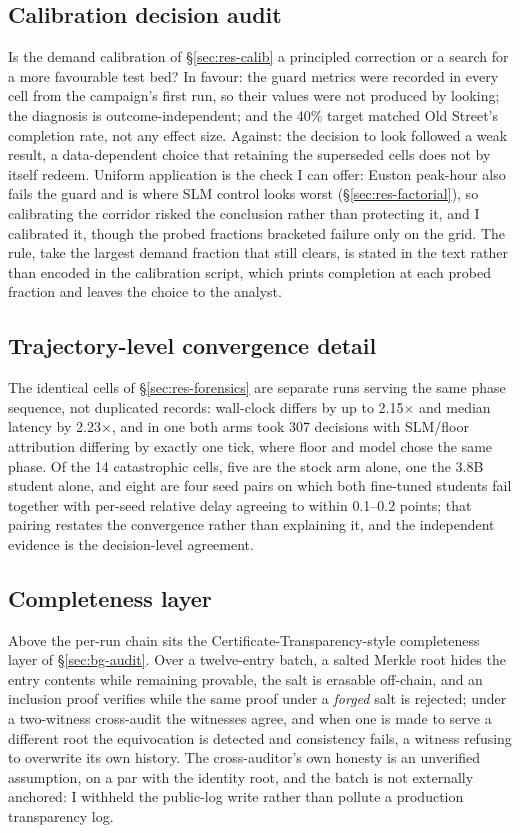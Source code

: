 \subsection{Calibration decision audit}\label{app:calib-audit}
Is the demand calibration of \S\ref{sec:res-calib} a principled correction
or a search for a more favourable test bed? In favour: the guard metrics
were recorded in every cell from the campaign's first run, so their values
were not produced by looking; the diagnosis is outcome-independent; and
the 40\% target matched Old Street's completion rate, not any effect size.
Against: the decision to look followed a weak result, a data-dependent
choice that retaining the superseded cells does not by itself redeem.
Uniform application is the check I can offer: Euston peak-hour also fails
the guard and is where SLM control looks worst (\S\ref{sec:res-factorial}),
so calibrating the corridor risked the conclusion rather than protecting
it, and I calibrated it, though the probed fractions bracketed failure only
on the grid. The rule, take the largest demand fraction that still clears,
is stated in the text rather than encoded in the calibration script, which
prints completion at each probed fraction and leaves the choice to the
analyst.

\subsection{Trajectory-level convergence detail}\label{app:convergence}
The identical cells of \S\ref{sec:res-forensics} are separate runs serving
the same phase sequence, not duplicated records: wall-clock differs by up
to 2.15$\times$ and median latency by 2.23$\times$, and in one both arms
took 307 decisions with SLM/floor attribution differing by exactly one
tick, where floor and model chose the same phase. Of the 14 catastrophic
cells, five are the stock arm alone, one the 3.8B student alone, and eight
are four seed pairs on which both fine-tuned students fail together with
per-seed relative delay agreeing to within 0.1--0.2 points; that pairing
restates the convergence rather than explaining it, and the independent
evidence is the decision-level agreement.

\subsection{Completeness layer}\label{app:ct}
Above the per-run chain sits the Certificate-Transparency-style
completeness layer of \S\ref{sec:bg-audit}. Over a twelve-entry batch, a
salted Merkle root hides the entry contents while remaining provable, the
salt is erasable off-chain, and an inclusion proof verifies while the same
proof under a \emph{forged} salt is rejected; under a two-witness
cross-audit the witnesses agree, and when one is made to serve a different
root the equivocation is detected and consistency fails, a witness
refusing to overwrite its own history. The cross-auditor's own honesty is
an unverified assumption, on a par with the identity root, and the batch is
not externally anchored: I withheld the public-log write rather than
pollute a production transparency log.

